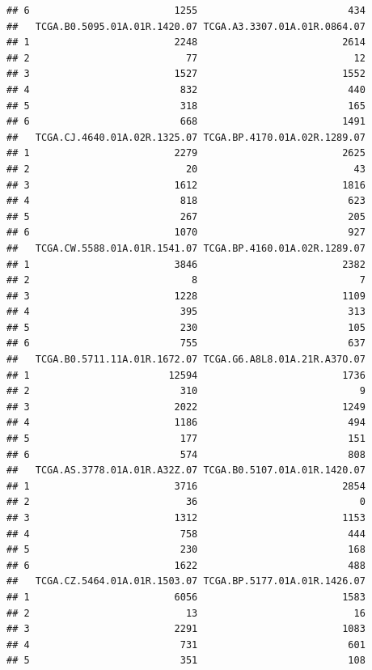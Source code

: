 \documentclass[
]{article}
\begin{document}
\begin{verbatim}
## 6                         1255                          434
##   TCGA.B0.5095.01A.01R.1420.07 TCGA.A3.3307.01A.01R.0864.07
## 1                         2248                         2614
## 2                           77                           12
## 3                         1527                         1552
## 4                          832                          440
## 5                          318                          165
## 6                          668                         1491
##   TCGA.CJ.4640.01A.02R.1325.07 TCGA.BP.4170.01A.02R.1289.07
## 1                         2279                         2625
## 2                           20                           43
## 3                         1612                         1816
## 4                          818                          623
## 5                          267                          205
## 6                         1070                          927
##   TCGA.CW.5588.01A.01R.1541.07 TCGA.BP.4160.01A.02R.1289.07
## 1                         3846                         2382
## 2                            8                            7
## 3                         1228                         1109
## 4                          395                          313
## 5                          230                          105
## 6                          755                          637
##   TCGA.B0.5711.11A.01R.1672.07 TCGA.G6.A8L8.01A.21R.A37O.07
## 1                        12594                         1736
## 2                          310                            9
## 3                         2022                         1249
## 4                         1186                          494
## 5                          177                          151
## 6                          574                          808
##   TCGA.AS.3778.01A.01R.A32Z.07 TCGA.B0.5107.01A.01R.1420.07
## 1                         3716                         2854
## 2                           36                            0
## 3                         1312                         1153
## 4                          758                          444
## 5                          230                          168
## 6                         1622                          488
##   TCGA.CZ.5464.01A.01R.1503.07 TCGA.BP.5177.01A.01R.1426.07
## 1                         6056                         1583
## 2                           13                           16
## 3                         2291                         1083
## 4                          731                          601
## 5                          351                          108

\end{verbatim}
\end{document}
